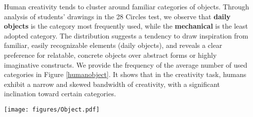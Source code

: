 Human creativity tends to cluster around familiar categories of objects. 
Through analysis of students' drawings in the 28 Circles test, we observe that \textbf{daily objects} is the category most frequently used, while the \textbf{ mechanical} is the least adopted category. 
The distribution suggests a tendency to draw inspiration from familiar, easily recognizable elements (daily objects), and reveals a clear preference for relatable, concrete objects over abstract forms or highly imaginative constructs. We provide the frequency of the average number of used categories in Figure \ref{humanobject}.
It shows that in the creativity task, humans exhibit a narrow and skewed bandwidth of creativity, with a significant inclination toward certain categories.



\begin{figure*}
    \texttt{[image: figures/Object.pdf]} %
    \label{humanobject}
\end{figure*}

